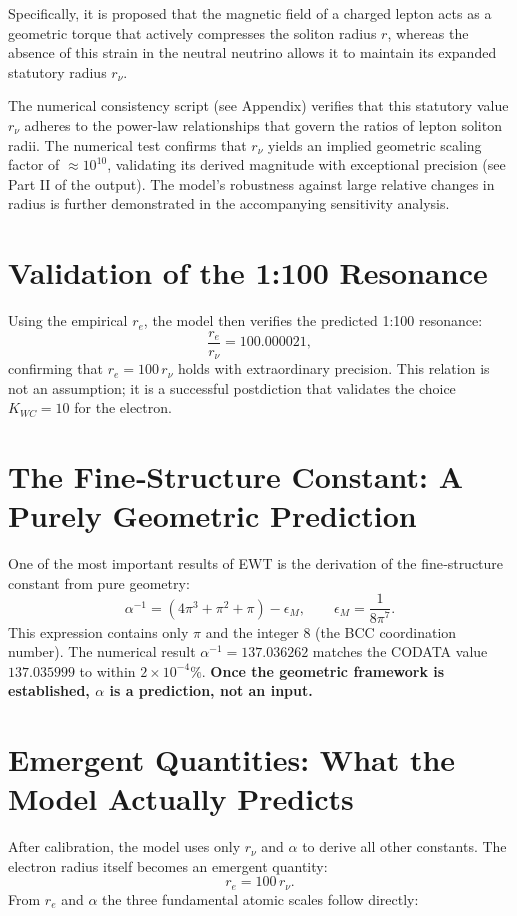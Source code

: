 \documentclass{article}
\begin{document}
	Specifically, it is proposed that the magnetic field of a charged lepton acts as a geometric torque that actively compresses the soliton radius $r$, whereas the absence of this strain in the neutral neutrino allows it to maintain its expanded statutory radius $r_\nu$.
	
	The numerical consistency script (see Appendix) verifies that this statutory value $r_\nu$ adheres to the power-law relationships that govern the ratios of lepton soliton radii. The numerical test confirms that $r_\nu$ yields an implied geometric scaling factor of $\approx 10^{10}$, validating its derived magnitude with exceptional precision (see Part II of the output). The model's robustness against large relative changes in radius is further demonstrated in the accompanying sensitivity analysis.
	
	\section{Validation of the 1:100 Resonance}
	Using the empirical $r_e$, the model then verifies the predicted 1:100 resonance:
	\begin{equation}
		\frac{r_e}{r_\nu} = 100.000021,
	\end{equation}
	confirming that $r_e = 100\,r_\nu$ holds with extraordinary precision. This relation is not an assumption; it is a successful postdiction that validates the choice $K_{WC}=10$ for the electron.
	
	\section{The Fine‑Structure Constant: A Purely Geometric Prediction}
	One of the most important results of EWT is the derivation of the fine‑structure constant from pure geometry:
	\begin{equation}
		\alpha^{-1} = (4\pi^3 + \pi^2 + \pi) - \epsilon_M,\qquad \epsilon_M = \frac{1}{8\pi^7}.
	\end{equation}
	This expression contains only $\pi$ and the integer $8$ (the BCC coordination number). The numerical result $\alpha^{-1}=137.036262$ matches the CODATA value $137.035999$ to within $2\times10^{-4}\%$. \textbf{Once the geometric framework is established, $\alpha$ is a prediction, not an input.}
	
	\section{Emergent Quantities: What the Model Actually Predicts}
	After calibration, the model uses only $r_\nu$ and $\alpha$ to derive all other constants. The electron radius itself becomes an emergent quantity:
	\begin{equation}
		r_e = 100\,r_\nu.
	\end{equation}
	From $r_e$ and $\alpha$ the three fundamental atomic scales follow directly:
	
\end{document}

